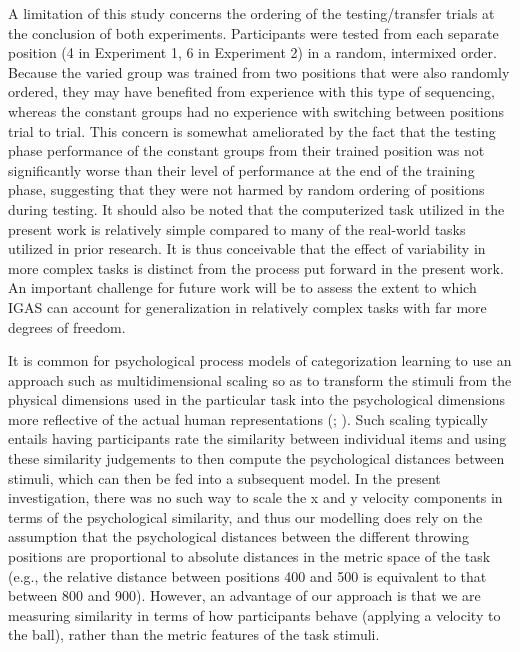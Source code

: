 \documentclass[
  11pt,
  letterpaper,
]{article}
\begin{document}
A limitation of this study concerns the ordering of the testing/transfer
trials at the conclusion of both experiments. Participants were tested
from each separate position (4 in Experiment 1, 6 in Experiment 2) in a
random, intermixed order. Because the varied group was trained from two
positions that were also randomly ordered, they may have benefited from
experience with this type of sequencing, whereas the constant groups had
no experience with switching between positions trial to trial. This
concern is somewhat ameliorated by the fact that the testing phase
performance of the constant groups from their trained position was not
significantly worse than their level of performance at the end of the
training phase, suggesting that they were not harmed by random ordering
of positions during testing. It should also be noted that the
computerized task utilized in the present work is relatively simple
compared to many of the real-world tasks utilized in prior research. It
is thus conceivable that the effect of variability in more complex tasks
is distinct from the process put forward in the present work. An
important challenge for future work will be to assess the extent to
which IGAS can account for generalization in relatively complex tasks
with far more degrees of freedom.

It is common for psychological process models of categorization learning
to use an approach such as multidimensional scaling so as to transform
the stimuli from the physical dimensions used in the particular task
into the psychological dimensions more reflective of the actual human
representations
(;
).
Such scaling typically entails having participants rate the similarity
between individual items and using these similarity judgements to then
compute the psychological distances between stimuli, which can then be
fed into a subsequent model. In the present investigation, there was no
such way to scale the x and y velocity components in terms of the
psychological similarity, and thus our modelling does rely on the
assumption that the psychological distances between the different
throwing positions are proportional to absolute distances in the metric
space of the task (e.g., the relative distance between positions 400 and
500 is equivalent to that between 800 and 900). However, an advantage of
our approach is that we are measuring similarity in terms of how
participants behave (applying a velocity to the ball), rather than the
metric features of the task stimuli.
\end{document}
